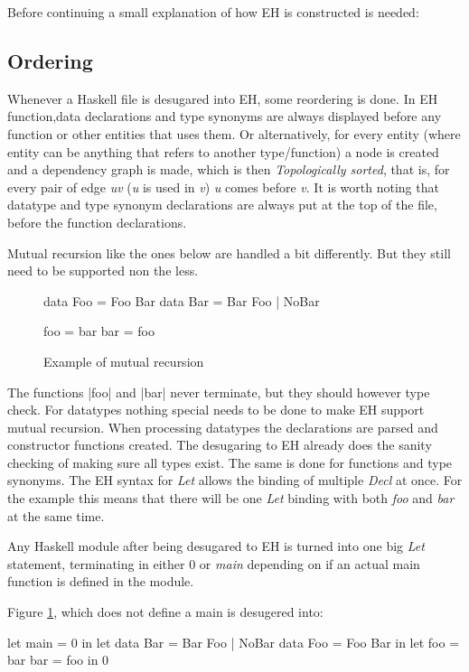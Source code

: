 Before continuing a small explanation of how EH is constructed is needed:
\subsection{Ordering}
Whenever a Haskell file is desugared into EH, some reordering is done. In EH function,data declarations and type synonyms are always displayed before any function or other entities that uses them. Or alternatively, for every entity (where entity can be anything that refers to another type/function) a node is created and a dependency graph is made, which is then \emph{Topologically sorted}, that is, for every pair of edge \emph{uv} (\emph{u} is used in \emph{v}) \emph{u} comes before \emph{v}. It is worth noting that datatype and type synonym declarations are always put at the top of the file, before the function declarations.

Mutual recursion like the ones below are handled a bit differently. But they still need to be supported non the less.

\begin{figure}
\begin{code}
data Foo = Foo Bar
data Bar = Bar Foo | NoBar

foo = bar
bar = foo
\end{code}
\caption{Example of mutual recursion}
\label{fig:mutrecurse}
\end{figure}

The functions |foo| and |bar| never terminate, but they should however type check. For datatypes nothing special needs to be done to make EH support mutual recursion. When processing datatypes the declarations are parsed and constructor functions created. The desugaring to EH already does the sanity checking of making sure all types exist. The same is done for functions and type synonyms. The EH syntax for \emph{Let} allows the binding of multiple \emph{Decl} at once. For the example this means that there will be one \emph{Let} binding with both \emph{foo} and \emph{bar} at the same time.

Any Haskell module after being desugared to EH is turned into one big \emph{Let} statement, terminating in either 0 or \emph{main} depending on if an actual main function is defined in the module.

Figure \ref{fig:mutrecurse}, which does not define a main is desugered into:

\begin{code}
let main = 0
in let data Bar  = Bar Foo | NoBar
       data Foo  = Foo Bar
   in let foo = bar
          bar = foo
      in 0
\end{code}


